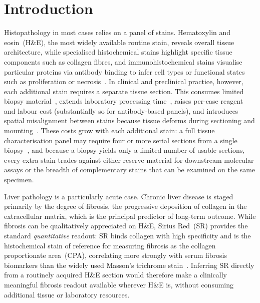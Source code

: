 \section{Introduction}

Histopathology in most cases relies on a panel of stains.
Hematoxylin and eosin~(H\&E), the most widely available routine stain, reveals overall
tissue architecture, while specialised histochemical stains highlight specific tissue
components such as collagen fibres, and immunohistochemical stains visualise
particular proteins via antibody binding to infer cell types or functional states such
as proliferation or necrosis~\cite{lefkowitch2006special, krishna2013role}.
In clinical and preclinical practice, however, each additional stain requires a separate
tissue section. This consumes limited biopsy material~\cite{rivenson2020emerging, dehaan2021deep},
extends laboratory processing time~\cite{dehaan2021deep}, raises per-case reagent and
labour cost (substantially so for antibody-based panels), and introduces spatial
misalignment between stains because tissue deforms during sectioning and
mounting~\cite{gatenbee2023virtual, chen2022mvfstain}.
These costs grow with each additional stain: a full tissue characterisation panel may
require four or more serial sections from a single
biopsy~\cite{clark2017immunohistochemistry}, and because a biopsy yields only a
limited number of usable sections, every extra stain trades against either reserve
material for downstream molecular assays or the breadth of complementary stains that
can be examined on the same specimen.

Liver pathology is a particularly acute case.
Chronic liver disease is staged primarily by the degree of fibrosis, the progressive
deposition of collagen in the extracellular matrix, which is the principal predictor of
long-term outcome.
While fibrosis can be qualitatively appreciated on H\&E, Sirius Red~(SR) provides the
standard \emph{quantitative} readout: SR binds collagen with high specificity and is the
histochemical stain of reference for measuring fibrosis as the collagen proportionate
area~(CPA), correlating more strongly with serum fibrosis biomarkers than the widely
used Masson's trichrome stain~\cite{huang2013sirius}.
Inferring SR directly from a routinely acquired H\&E section would therefore make a
clinically meaningful fibrosis readout available wherever H\&E is, without consuming
additional tissue or laboratory resources.

